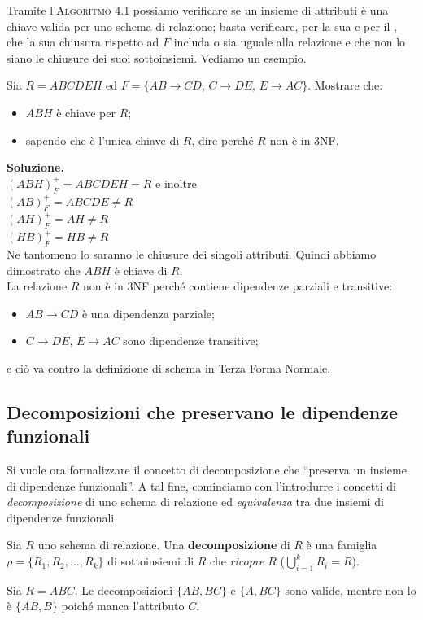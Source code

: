 Tramite l'\textsc{Algoritmo 4.1} possiamo verificare se un insieme di attributi è una chiave valida per
uno schema di relazione; basta verificare, per la sua  e per il ,
che la sua chiusura rispetto ad $F$ includa o sia uguale alla relazione e che non lo siano le chiusure
dei suoi sottoinsiemi. Vediamo un esempio.
\begin{exmp}
Sia $R=ABCDEH$ ed $F=\{AB\rightarrow CD$, $C\rightarrow DE$, $E\rightarrow AC\}$. Mostrare che:
\begin{itemize}
 \item $ABH$ è chiave per $R$;
 \item sapendo che è l'unica chiave di $R$, dire perché $R$ non è in 3NF.
\end{itemize}

\noindent \textbf{Soluzione.}\\
$(ABH)^+_F = ABCDEH = R$ e inoltre\\
$(AB)^+_F = ABCDE \not= R$\\
$(AH)^+_F = AH \not= R$\\
$(HB)^+_F = HB \not= R$\\

Ne tantomeno lo saranno le chiusure dei singoli attributi. Quindi abbiamo dimostrato che $ABH$ è chiave di $R$.\\
La relazione $R$ non è in 3NF perché contiene dipendenze parziali e transitive:
\begin{itemize}
 \item $AB\rightarrow CD$ è una dipendenza parziale;
 \item $C\rightarrow DE$, $E\rightarrow AC$ sono dipendenze transitive;
\end{itemize}
e ciò va contro la definizione di schema in Terza Forma Normale.
\end{exmp}


\subsection{Decomposizioni che preservano le dipendenze funzionali}
Si vuole ora formalizzare il concetto di decomposizione che ``preserva un insieme di dipendenze funzionali''.
A tal fine, cominciamo con l'introdurre i concetti di \emph{decomposizione} di uno schema di relazione ed 
\emph{equivalenza} tra due insiemi di dipendenze funzionali.\\
\begin{defn}
Sia $R$ uno schema di relazione. Una \textbf{decomposizione} di $R$ è una famiglia $\rho = \{R_1, R_2, \ldots, 
R_k\}$ di sottoinsiemi di $R$ che \emph{ricopre} $R$ ($\bigcup_{i=1}^k R_i = R$).
\end{defn}
\begin{exmp}
Sia $R = ABC$. Le decomposizioni $\{AB, BC\}$ e $\{A, BC\}$ sono valide, mentre non lo è $\{AB, B\}$ poiché
manca l'attributo $C$.
\end{exmp}

